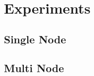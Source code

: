 \chapter{Experiments}\label{chpt:3:experiments}
\thispagestyle{chaptertitle} %


\section{Single Node}

\section{Multi Node}


